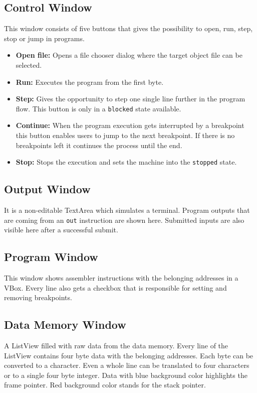 \subsection{Control Window}
This window consists of five buttons that gives the possibility to open, run, step, stop or jump  in programs. 
\begin{itemize}
\item \textbf{Open file: }Opens a file chooser dialog where the target object file can be selected.
\item \textbf{Run: }Executes the program from the first byte. 
\item \textbf{Step: }Gives the opportunity  to step one single  line further in the program flow. This button is only  in a \lstinline$blocked$ state available.
\item \textbf{Continue: }When the program execution gets interrupted by a breakpoint this button enables users to  jump to the next breakpoint. If there is no breakpoints left it continues the process until the end.
\item \textbf{Stop: }Stops the execution and sets the machine into the \lstinline$stopped$ state.
\end{itemize}
\subsection{Output Window}
 It is a non-editable TextArea  which simulates a terminal. Program outputs that are coming from an  \lstinline$out$ instruction are shown here. Submitted inputs are also visible here after a successful submit.
\subsection{Program Window}
 This window shows assembler instructions with the belonging addresses in a VBox. Every line also gets a checkbox that is responsible for setting and removing breakpoints.
\subsection{Data Memory Window}
A ListView filled with raw data from the data memory. Every line of the ListView contains four byte data with the belonging addresses.  Each byte can be converted to a character. Even a whole line can be translated to four characters or to a single four byte integer. Data with blue background color highlights the frame pointer. Red background color stands for the stack pointer.
